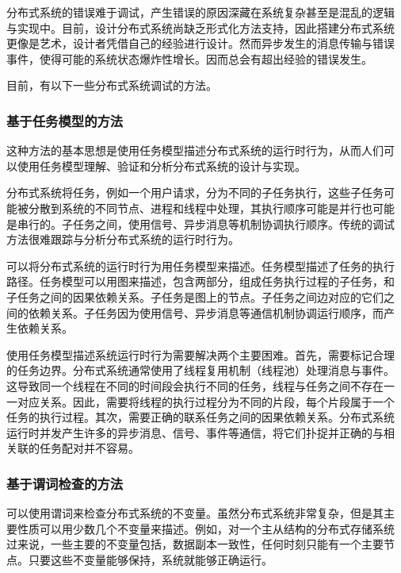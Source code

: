 分布式系统的错误难于调试，产生错误的原因深藏在系统复杂甚至是混乱的逻辑
与实现中。目前，设计分布式系统尚缺乏形式化方法支持，因此搭建分布式系统
更像是艺术，设计者凭借自己的经验进行设计。然而异步发生的消息传输与错误
事件，使得可能的系统状态爆炸性增长。因而总会有超出经验的错误发生。

目前，有以下一些分布式系统调试的方法。

\subsubsection*{基于任务模型的方法}


这种方法的基本思想是使用任务模型描述分布式系统的运行时行为，从而人们可
以使用任务模型理解、验证和分析分布式系统的设计与实现。

分布式系统将任务，例如一个用户请求，分为不同的子任务执行，这些子任务可
能被分散到系统的不同节点、进程和线程中处理，其执行顺序可能是并行也可能
是串行的。子任务之间，使用信号、异步消息等机制协调执行顺序。传统的调试
方法很难跟踪与分析分布式系统的运行时行为。


可以将分布式系统的运行时行为用任务模型来描述。任务模型描述了任务的执行
路径。任务模型可以用图来描述，包含两部分，组成任务执行过程的子任务，和
子任务之间的因果依赖关系。子任务是图上的节点。子任务之间边对应的它们之
间的依赖关系。子任务因为使用信号、异步消息等通信机制协调运行顺序，而产
生依赖关系。

使用任务模型描述系统运行时行为需要解决两个主要困难。首先，需要标记合理
的任务边界。分布式系统通常使用了线程复用机制（线程池）处理消息与事件。
这导致同一个线程在不同的时间段会执行不同的任务，线程与任务之间不存在一
一对应关系。因此，需要将线程的执行过程分为不同的片段，每个片段属于一个
任务的执行过程。其次，需要正确的联系任务之间的因果依赖关系。分布式系统
运行时并发产生许多的异步消息、信号、事件等通信，将它们扑捉并正确的与相
关联的任务配对并不容易。

\subsubsection*{基于谓词检查的方法}

可以使用谓词来检查分布式系统的不变量。虽然分布式系统非常复杂，但是其主
要性质可以用少数几个不变量来描述。例如，对一个主从结构的分布式存储系统
过来说，一些主要的不变量包括，数据副本一致性，任何时刻只能有一个主要节
点。只要这些不变量能够保持，系统就能够正确运行。

